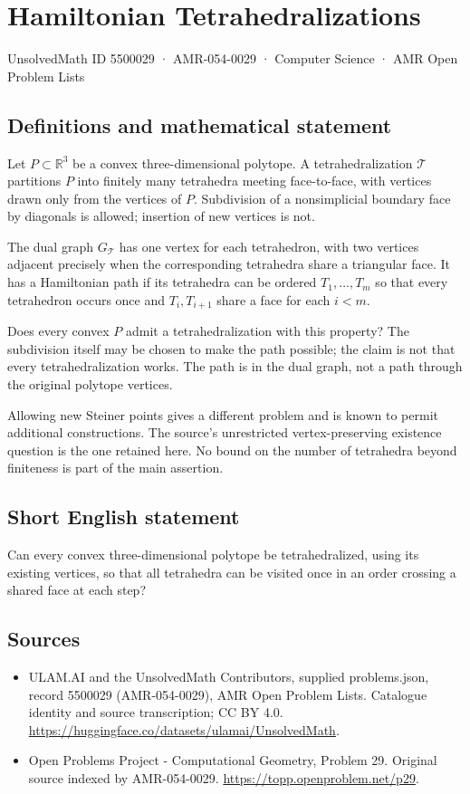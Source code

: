 \documentclass[11pt,a4paper]{article}
\begin{document}
\section*{Hamiltonian Tetrahedralizations}\label{5500029}
{\small UnsolvedMath ID 5500029 · AMR-054-0029 · Computer Science · AMR Open Problem Lists}
\subsection{Definitions and mathematical statement}
Let $P\subset\mathbb R^3$ be a convex three-dimensional polytope. A
tetrahedralization $\mathcal T$ partitions $P$ into finitely many
tetrahedra meeting face-to-face, with vertices drawn only from the
vertices of $P$. Subdivision of a nonsimplicial boundary face by
diagonals is allowed; insertion of new vertices is not.

The dual graph $G_{\mathcal T}$ has one vertex for each tetrahedron,
with two vertices adjacent precisely when the corresponding
tetrahedra share a triangular face. It has a Hamiltonian path if its
tetrahedra can be ordered $T_1,\ldots,T_m$ so that every tetrahedron
occurs once and $T_i,T_{i+1}$ share a face for each $i<m$.

Does every convex $P$ admit a tetrahedralization with this property?
The subdivision itself may be chosen to make the path possible;
the claim is not that every tetrahedralization works. The path is
in the dual graph, not a path through the original polytope vertices.

Allowing new Steiner points gives a different problem and is known
to permit additional constructions. The source's unrestricted
vertex-preserving existence question is the one retained here.
No bound on the number of tetrahedra beyond finiteness is part of
the main assertion.
\subsection{Short English statement}
Can every convex three-dimensional polytope be tetrahedralized, using
its existing vertices, so that all tetrahedra can be visited once in
an order crossing a shared face at each step?
\subsection{Sources}
\begin{itemize}
\item[S1] ULAM.AI and the UnsolvedMath Contributors, supplied problems.json, record 5500029 (AMR-054-0029), AMR Open Problem Lists. Catalogue identity and source transcription; CC BY 4.0.
\url{https://huggingface.co/datasets/ulamai/UnsolvedMath}.
\item[S2] Open Problems Project - Computational Geometry, Problem 29. Original source indexed by AMR-054-0029.
\url{https://topp.openproblem.net/p29}.
\end{itemize}
\end{document}

